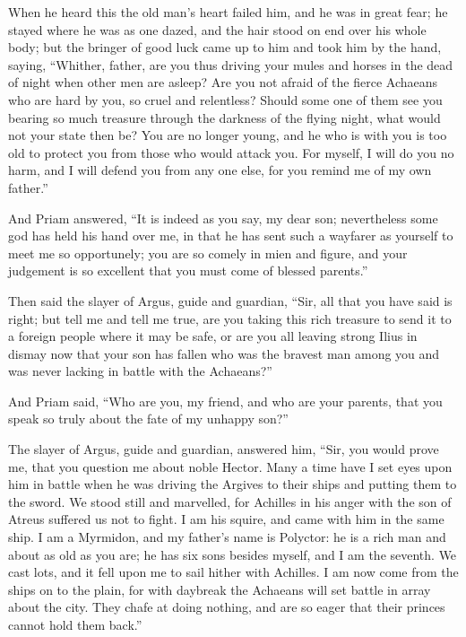 When he heard this the old man’s heart failed him, and he was in great
fear; he stayed where he was as one dazed, and the hair stood on end over
his whole body; but the bringer of good luck came up to him and took him
by the hand, saying, “Whither, father, are you thus driving your mules and
horses in the dead of night when other men are asleep? Are you not afraid
of the fierce Achaeans who are hard by you, so cruel and relentless?
Should some one of them see you bearing so much treasure through the
darkness of the flying night, what would not your state then be? You are
no longer young, and he who is with you is too old to protect you from
those who would attack you. For myself, I will do you no harm, and I will
defend you from any one else, for you remind me of my own father.”

And Priam answered, “It is indeed as you say, my dear son; nevertheless
some god has held his hand over me, in that he has sent such a wayfarer as
yourself to meet me so opportunely; you are so comely in mien and figure,
and your judgement is so excellent that you must come of blessed parents.”

Then said the slayer of Argus, guide and guardian, “Sir, all that you have
said is right; but tell me and tell me true, are you taking this rich
treasure to send it to a foreign people where it may be safe, or are you
all leaving strong Ilius in dismay now that your son has fallen who was
the bravest man among you and was never lacking in battle with the
Achaeans?”

And Priam said, “Who are you, my friend, and who are your parents, that
you speak so truly about the fate of my unhappy son?”

The slayer of Argus, guide and guardian, answered him, “Sir, you would
prove me, that you question me about noble Hector. Many a time have I set
eyes upon him in battle when he was driving the Argives to their ships and
putting them to the sword. We stood still and marvelled, for Achilles in
his anger with the son of Atreus suffered us not to fight. I am his
squire, and came with him in the same ship. I am a Myrmidon, and my
father’s name is Polyctor: he is a rich man and about as old as you are;
he has six sons besides myself, and I am the seventh. We cast lots, and it
fell upon me to sail hither with Achilles. I am now come from the ships on
to the plain, for with daybreak the Achaeans will set battle in array
about the city. They chafe at doing nothing, and are so eager that their
princes cannot hold them back.”

